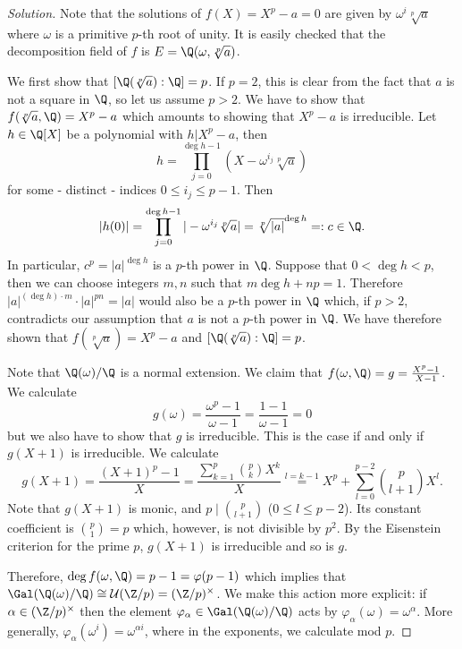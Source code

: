 \documentclass[a4paper,10pt,reqno]{amsart}
\newenvironment{sol}
  {\renewcommand\qedsymbol{$\blacksquare$}\begin{proof}[Solution]}
  {\end{proof}}
\begin{document}
\begin{sol}
    Note that the solutions of $f(X) = X^p - a = 0$ are given by $\omega^i \sqrt[p]{a}$ where $\omega$ is a primitive $p$-th root of unity. It is easily checked that the decomposition field of $f$ is $E = \Q(\omega,\sqrt[p]{a})$.

    We first show that $[\Q(\sqrt[p]{a}):\Q] = p$. If $p = 2$, this is clear from the fact that $a$ is not a square in $\Q$, so let us assume $p > 2$. We have to show that $f(\sqrt[p]{a},\Q) = X^p-a$ which amounts to showing that $X^p-a$ is irreducible. Let $h \in \Q[X]$ be a polynomial with $h|X^p-a$, then
    \[
    h = \prod_{j=0}^{\deg h -1} (X - \omega^{i_j}\sqrt[p]{a})
    \]
    for some - distinct - indices $0 \leq i_j \leq p-1$. Then
    \[
    |h(0)| = \prod_{j=0}^{\deg h -1} |-  \omega^{i_j}\sqrt[p]{a}| = \sqrt[p]{|a|}^{\deg h} =: c \in \Q.
    \]
    In particular, $c^p = |a|^{\deg h}$ is a $p$-th power in $\Q$. Suppose that $0 < \deg h < p$, then we can choose integers $m,n$ such that $m\deg h + np = 1$. Therefore $|a|^{(\deg h) \cdot m} \cdot |a|^{pn} = |a|$ would also be a $p$-th power in $\Q$ which, if $p > 2$, contradicts our assumption that $a$ is not a $p$-th power in $\Q$. We have therefore shown that $f(\sqrt[p]{a}) = X^p-a$ and $[\Q(\sqrt[p]{a}):\Q] = p$.

    Note that $\Q(\omega)/\Q$ is a normal extension. We claim that $f(\omega,\Q) = g = \frac{X^p-1}{X-1}$. We calculate
    \[
    g(\omega) = \frac{\omega^p-1}{\omega-1} = \frac{1-1}{\omega-1} = 0
    \]
    but we also have to show that $g$ is irreducible. This is the case if and only if $g(X+1)$ is irreducible. We calculate
    \[
    g(X+1) = \frac{(X+1)^p-1}{X} = \frac{\sum_{k=1}^p\binom{p}{k}X^k}{X} \overset{l = k-1}{=} X^p + \sum_{l=0}^{p-2} \binom{p}{l+1}X^l.
    \]
    Note that $g(X+1)$ is monic, and $p \mid \binom{p}{l+1}$ ($0 \leq l \leq p-2$). Its constant coefficient is $\binom{p}{1} = p$ which, however, is not divisible by $p^2$. By the Eisenstein criterion for the prime $p$, $g(X+1)$ is irreducible and so is $g$.
    
    Therefore, $\deg f(\omega,\Q) = p-1 = \varphi(p-1)$ which implies that $\Gal(\Q(\omega)/\Q) \cong \mathcal{U}(\Z/p) = (\Z/p)^{\times}$. We make this action more explicit: if $\alpha \in (\Z/p)^{\times}$ then the element $\varphi_{\alpha} \in \Gal(\Q(\omega)/\Q)$ acts by $\varphi_{\alpha}(\omega) = \omega^{\alpha}$. More generally, $\varphi_{\alpha}(\omega^i) = \omega^{\alpha i}$, where in the exponents, we calculate mod $p$.


\end{sol}
\end{document}
